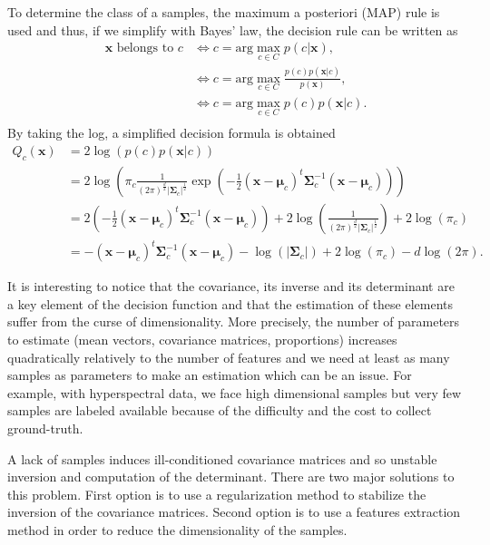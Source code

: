 \documentclass[a4paper,11pt,DIV=16,abstracton]{scrartcl}
\begin{document}
    To determine the class of a samples, the maximum a posteriori (MAP) rule is used and thus, if we simplify with Bayes' law, the decision rule can be written as
    \begin{align*}
        \mathbf{x} \text{ belongs to } c &\Leftrightarrow c = \text{arg} \max_{c \in C} p(c|\mathbf{x}),\\
                                         &\Leftrightarrow c = \text{arg} \max_{c \in C} \frac{p(c) p(\mathbf{x}|c)}{p(\mathbf{x})},\\
                                         &\Leftrightarrow c = \text{arg} \max_{c \in C} p(c) p(\mathbf{x}|c).\\
    \end{align*}
    By taking the log, a simplified decision formula is obtained
    \begin{align}
        Q_c(\mathbf{x})
        &= 2 \log \left( p(c) p(\mathbf{x}|c) \right) \nonumber \\
        &= 2 \log \left( \pi_c \frac{1}{(2\pi)^{\frac{d}{2}} |\boldsymbol{\Sigma}_c|^{\frac{1}{2}}} \exp \left( -\frac{1}{2} (\mathbf{x} - \boldsymbol{\mu}_c)^t \boldsymbol{\Sigma}_c^{-1} (\mathbf{x} - \boldsymbol{\mu}_c) \right) \right) \nonumber \\
        &= 2 \left( -\frac{1}{2} (\mathbf{x} - \boldsymbol{\mu}_c)^t \boldsymbol{\Sigma}_c^{-1} (\mathbf{x} - \boldsymbol{\mu}_c) \right) + 2 \log \left( \frac{1}{(2\pi)^{\frac{d}{2}} |\boldsymbol{\Sigma}_c|^{\frac{1}{2}}} \right) + 2 \log (\pi_c) \nonumber \\
        &= - (\mathbf{x} - \boldsymbol{\mu}_c)^t \boldsymbol{\Sigma}_c^{-1} (\mathbf{x} - \boldsymbol{\mu}_c) - \log (|\boldsymbol{\Sigma}_c|) + 2 \log (\pi_c) - d \log (2\pi).
        \label{eq:decision}
    \end{align}

    It is interesting to notice that the covariance, its inverse and its determinant are a key element of the decision function and that the estimation of these elements suffer from the curse of dimensionality. More precisely, the number of parameters to estimate (mean vectors, covariance matrices, proportions) increases quadratically relatively to the number of features and we need at least as many samples as parameters to make an estimation which can be an issue. For example, with hyperspectral data, we face high dimensional samples but very few samples are labeled available because of the difficulty and the cost to collect ground-truth.

    A lack of samples induces ill-conditioned covariance matrices and so unstable inversion and computation of the determinant. There are two major solutions to this problem. First option is to use a regularization method to stabilize the inversion of the covariance matrices. Second option is to use a features extraction method in order to reduce the dimensionality of the samples.
\end{document}
